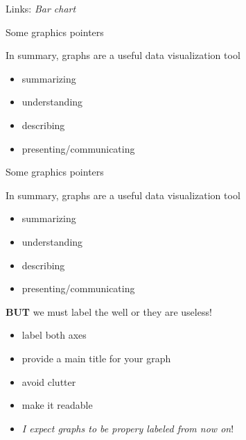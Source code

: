 \documentclass[ignorenonframetext,t]{beamer}
\newenvironment{Shaded}{\begin{snugshade}}{\end{snugshade}}
\newcommand{\KeywordTok}[1]{\textcolor[rgb]{0.13,0.29,0.53}{\textbf{#1}}}
\newcommand{\DataTypeTok}[1]{\textcolor[rgb]{0.13,0.29,0.53}{#1}}
\newcommand{\StringTok}[1]{\textcolor[rgb]{0.31,0.60,0.02}{#1}}
\newcommand{\CommentTok}[1]{\textcolor[rgb]{0.56,0.35,0.01}{\textit{#1}}}
\newcommand{\OtherTok}[1]{\textcolor[rgb]{0.56,0.35,0.01}{#1}}
\newcommand{\OperatorTok}[1]{\textcolor[rgb]{0.81,0.36,0.00}{\textbf{#1}}}
\newcommand{\NormalTok}[1]{#1}
\providecommand{\tightlist}{%
  \setlength{\itemsep}{0pt}\setlength{\parskip}{0pt}}
\begin{document}
\begin{frame}[fragile]{Links: \emph{Bar chart}}

\begin{Shaded}
\end{Shaded}


\end{frame}

\begin{frame}{Some graphics pointers}

In summary, graphs are a useful data visualization tool

\begin{itemize}
\tightlist
\item
  summarizing
\item
  understanding
\item
  describing
\item
  presenting/communicating
\end{itemize}

\end{frame}

\begin{frame}{Some graphics pointers}

In summary, graphs are a useful data visualization tool

\begin{itemize}
\tightlist
\item
  summarizing
\item
  understanding
\item
  describing
\item
  presenting/communicating
\end{itemize}

\textbf{BUT} we must label the well or they are useless!

\begin{itemize}
\tightlist
\item
  label both axes
\item
  provide a main title for your graph
\item
  avoid clutter
\item
  make it readable
\item
  \emph{I expect graphs to be propery labeled from now on}!
\end{itemize}

\end{frame}
\end{document}
